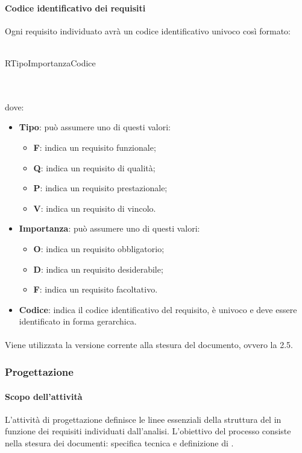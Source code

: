  \paragraph{Codice identificativo dei requisiti}
 Ogni requisito individuato avrà un codice identificativo univoco così formato: \\ \\
 \centerline{R\textbraceleft{}Tipo\textbraceright{}\textbraceleft{}Importanza\textbraceright{}\textbraceleft{}Codice\textbraceright{}}
 \\ \\
 dove:
 \begin{itemize}
 	\item \textbf{Tipo}: può assumere uno di questi valori:
 	\begin{itemize}
 		\item \textbf{F}: indica un requisito funzionale;
 		\item \textbf{Q}: indica un requisito di qualità;
 		\item \textbf{P}: indica un requisito prestazionale;
 		\item \textbf{V}: indica un requisito di vincolo.
 	\end{itemize}
 	\item \textbf{Importanza}: può assumere uno di questi valori:
 	\begin{itemize}
 		\item \textbf{O}: indica un requisito obbligatorio;
 		\item \textbf{D}: indica un requisito desiderabile;
 		\item \textbf{F}: indica un requisito facoltativo.
 	\end{itemize}
 	\item \textbf{Codice}: indica il codice identificativo del requisito, è univoco e deve essere identificato in forma gerarchica.
 \end{itemize}
 \paragraph{}
 Viene utilizzata la versione corrente alla stesura del documento, ovvero la 2.5.

\subsubsection{Progettazione}
 \paragraph{Scopo dell'attività}
L'attività di progettazione definisce le linee essenziali della struttura del   in
funzione dei requisiti individuati dall'analisi. L'obiettivo del processo consiste nella stesura dei
documenti: specifica tecnica e definizione di .
